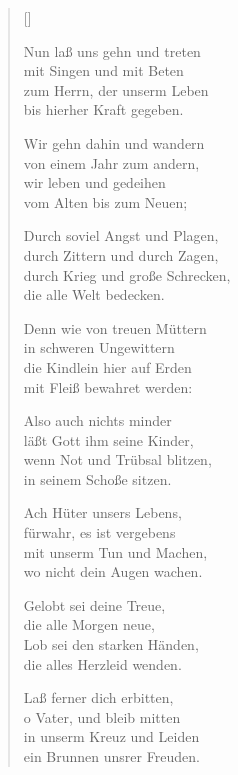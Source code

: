 \begin{multicols}{2}
\settowidth{\versewidth}{Durch soviel Angst und Plagen,}
\begin{verse}[\versewidth]
 
 Nun laß uns gehn und treten\\
mit Singen und mit Beten\\
zum Herrn, der unserm Leben\\
bis hierher Kraft gegeben.
 
 Wir gehn dahin und wandern\\
von einem Jahr zum andern,\\
wir leben und gedeihen\\
vom Alten bis zum Neuen;
 
 Durch soviel Angst und Plagen,\\
durch Zittern und durch Zagen,\\
durch Krieg und große Schrecken,\\
die alle Welt bedecken.
 
 Denn wie von treuen Müttern\\
in schweren Ungewittern\\
die Kindlein hier auf Erden\\
mit Fleiß bewahret werden:
 
 Also auch nichts minder\\
läßt Gott ihm seine Kinder,\\
wenn Not und Trübsal blitzen,\\
in seinem Schoße sitzen.
 
 Ach Hüter unsers Lebens,\\
fürwahr, es ist vergebens\\
mit unserm Tun und Machen,\\
wo nicht dein Augen wachen.
 
 Gelobt sei deine Treue,\\
die alle Morgen neue,\\
Lob sei den starken Händen,\\
die alles Herzleid wenden.
 
 Laß ferner dich erbitten,\\
o Vater, und bleib mitten\\
in unserm Kreuz und Leiden\\
ein Brunnen unsrer Freuden.
 

\end{verse}
\end{multicols}
